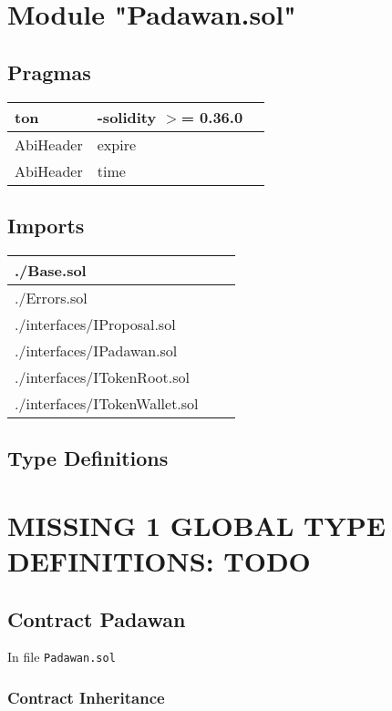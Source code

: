 
\section{Module "Padawan.sol"}


\subsection{Pragmas}


\noindent\begin{tabular}{|l|l|p{5cm}|}\hline
ton & -solidity $>$= 0.36.0 &\\\hline
AbiHeader &  expire &\\\hline
AbiHeader &  time &\\\hline
\end{tabular}


\subsection{Imports}


\noindent\begin{tabular}{|l|l|p{5cm}|}\hline
./Base.sol &\\\hline
./Errors.sol &\\\hline
./interfaces/IProposal.sol &\\\hline
./interfaces/IPadawan.sol &\\\hline
./interfaces/ITokenRoot.sol &\\\hline
./interfaces/ITokenWallet.sol &\\\hline
\end{tabular}


\subsection{Type Definitions}

\section{MISSING 1 GLOBAL TYPE DEFINITIONS: TODO}

\subsection{Contract Padawan}

\minitoc

In file {\tt Padawan.sol}

\subsubsection{Contract Inheritance}



